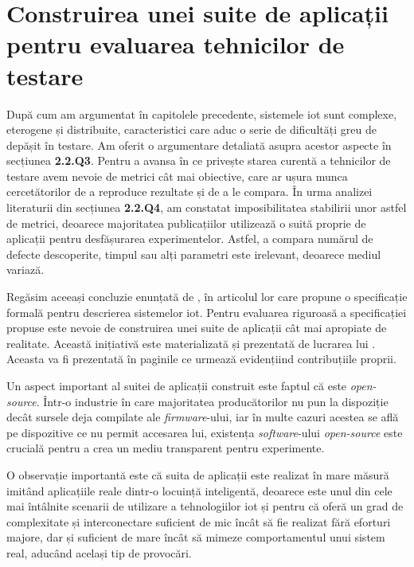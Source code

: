 \chapter{Construirea unei suite de aplicații pentru evaluarea 
tehnicilor de testare}

După cum am argumentat în capitolele precedente, sistemele \acrshort{iot} sunt complexe, eterogene și distribuite, caracteristici care aduc o serie de dificultăți greu de depășit în testare. Am oferit o argumentare detaliată asupra acestor aspecte în secțiunea \textbf{2.2.Q3}. Pentru a avansa în ce privește starea curentă a tehnicilor de testare avem nevoie de metrici cât mai obiective, care ar ușura munca cercetătorilor de a reproduce rezultate și de a le compara. În urma analizei literaturii din secțiunea \textbf{2.2.Q4}, am constatat imposibilitatea stabilirii unor astfel de metrici, deoarece majoritatea publicațiilor utilizează o suită proprie de aplicații pentru desfășurarea experimentelor. Astfel, a compara numărul de defecte descoperite, timpul sau alți parametri este irelevant, deoarece mediul variază. 

Regăsim aceeași concluzie enunțată de \citet{Paduraru2021}, în articolul lor care propune o specificație formală pentru descrierea sistemelor \acrshort{iot}. Pentru evaluarea riguroasă a specificației propuse este nevoie de construirea unei suite de aplicații cât mai apropiate de realitate. Această inițiativă este materializată și prezentată de lucrarea lui \citet{Cristea2022}. Aceasta va fi prezentată în paginile ce urmează evidențiind contribuțiile proprii.

Un aspect important al suitei de aplicații construit este faptul că este \textit{open-source}. Într-o industrie în care majoritatea producătorilor nu pun la dispoziție decât sursele deja compilate ale \textit{firmware}-ului, iar în multe cazuri acestea se află pe dispozitive ce nu permit accesarea lui, existența \textit{software}-ului \textit{open-source} este crucială pentru a crea un mediu transparent pentru experimente.

O observație importantă este că suita de aplicații este realizat în mare măsură imitând aplicațiile reale dintr-o locuință inteligentă, deoarece este unul din cele mai întâlnite scenarii de utilizare a tehnologiilor \acrshort{iot} și pentru că oferă un grad de complexitate și interconectare suficient de mic încât să fie realizat fără eforturi majore, dar și suficient de mare încât să mimeze comportamentul unui sistem real, aducând același tip de provocări.

